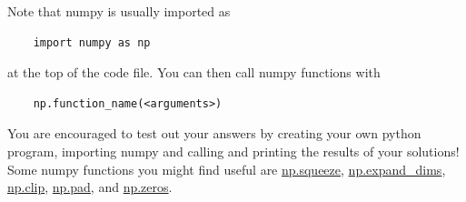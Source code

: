 Note that numpy is usually imported as
\begin{verbatim}
    import numpy as np
\end{verbatim}
at the top of the code file. You can then call numpy functions with \begin{verbatim}
    np.function_name(<arguments>)
\end{verbatim}
You are encouraged to test out your answers by creating your own python program, importing numpy and calling and printing the results of your solutions! Some numpy functions you might find useful are \href{https://numpy.org/doc/stable/reference/generated/numpy.squeeze.html}{np.squeeze}, \href{https://numpy.org/doc/stable/reference/generated/numpy.expand_dims.html}{np.expand\_dims}, \href{https://numpy.org/doc/stable/reference/generated/numpy.clip.html}{np.clip}, \href{https://numpy.org/doc/stable/reference/generated/numpy.pad.html}{np.pad}, and \href{https://numpy.org/doc/stable/reference/generated/numpy.zeros.html}{np.zeros}.

